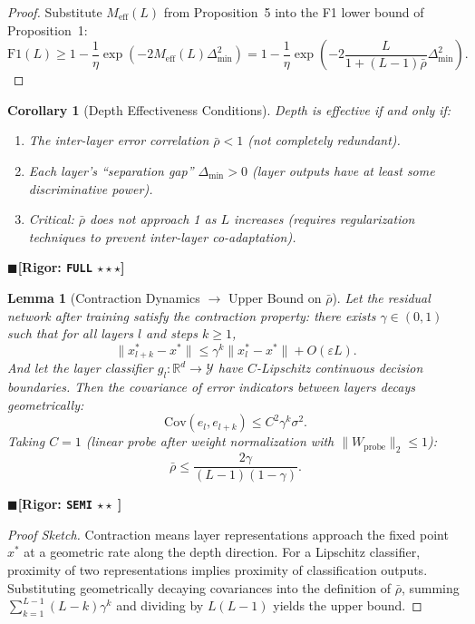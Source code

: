 \documentclass[12pt,a4paper]{article}
\newtheorem{lemma}[theorem]{Lemma}
\newtheorem{corollary}[theorem]{Corollary}
\theoremstyle{definition}
\theoremstyle{remark}
\newcommand{\rigorFull}{$\blacksquare$\;\textbf{[Rigor: \texttt{FULL} $\star\star\star$]}}
\newcommand{\rigorSemi}{$\blacksquare$\;\textbf{[Rigor: \texttt{SEMI} $\star\star\;$]}}
\begin{document}
\begin{proof}
Substitute $M_{\text{eff}}(L)$ from Proposition~5 into the F1 lower bound of Proposition~1:
\begin{equation}
\mathrm{F1}(L) \geq 1 - \frac{1}{\eta}\exp(-2M_{\text{eff}}(L)\Delta_{\min}^2) = 1 - \frac{1}{\eta}\exp\left(-2\frac{L}{1 + (L-1)\bar{\rho}}\Delta_{\min}^2\right).
\end{equation}
\end{proof}

\begin{corollary}[Depth Effectiveness Conditions]
\label{cor:2}
Depth is effective if and only if:
\begin{enumerate}[label=\arabic*.]
\item The inter-layer error correlation $\bar{\rho} < 1$ (not completely redundant).
\item Each layer's ``separation gap'' $\Delta_{\min} > 0$ (layer outputs have at least some discriminative power).
\item Critical: $\bar{\rho}$ does not approach 1 as $L$ increases (requires regularization techniques to prevent inter-layer co-adaptation).
\end{enumerate}
\end{corollary}
\rigorFull

\begin{lemma}[Contraction Dynamics $\to$ Upper Bound on $\bar{\rho}$]
\label{lem:3.1}
Let the residual network after training satisfy the contraction property: there exists $\gamma \in (0, 1)$ such that for all layers $l$ and steps $k \geq 1$,
\begin{equation}
\boxed{\|x_{l+k}^* - x^*\| \leq \gamma^k \|x_l^* - x^*\| + O(\varepsilon L)}.
\end{equation}
And let the layer classifier $g_l: \mathbb{R}^d \to \mathcal{Y}$ have $C$-Lipschitz continuous decision boundaries. Then the covariance of error indicators between layers decays geometrically:
\begin{equation}
\boxed{\mathrm{Cov}(e_l, e_{l+k}) \leq C^2 \gamma^k \sigma^2}.
\end{equation}
Taking $C=1$ (linear probe after weight normalization with $\|W_{\text{probe}}\|_2 \leq 1$):
\begin{equation}
\boxed{\bar{\rho} \leq \frac{2\gamma}{(L-1)(1-\gamma)}}.
\end{equation}
\end{lemma}
\rigorSemi

\begin{proof}[Proof Sketch]
Contraction means layer representations approach the fixed point $x^*$ at a geometric rate along the depth direction. For a Lipschitz classifier, proximity of two representations implies proximity of classification outputs. Substituting geometrically decaying covariances into the definition of $\bar{\rho}$, summing $\sum_{k=1}^{L-1} (L-k)\gamma^k$ and dividing by $L(L-1)$ yields the upper bound.
\end{proof}
\end{document}

